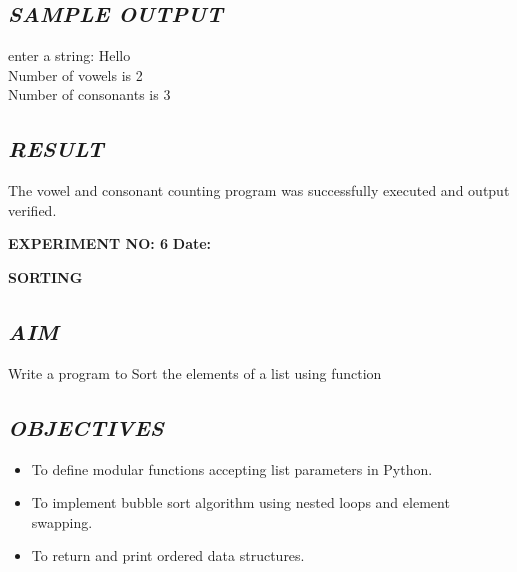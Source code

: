 \documentclass[11pt,a4paper]{article}
\begin{document}
\subsection*{\textit{SAMPLE OUTPUT}}
\begin{tcolorbox}[colback=black!85,colframe=navyblue,title=\textbf{Terminal Output},coltitle=white,fonttitle=\bfseries\small]
\small\ttfamily\color{green!30!white}
enter a string: Hello\\
Number of vowels is  2\\
Number of consonants is  3
\end{tcolorbox}

\subsection*{\textit{RESULT}}
The vowel and consonant counting program was successfully executed and output verified.

\newpage

\noindent
\textbf{\large EXPERIMENT NO: 6} \hfill \textbf{\large Date: \underline{\hspace{3cm}}}

\vspace{0.2cm}
\begin{center}
{\Huge \textbf{\textcolor{navyblue}{SORTING}}}
\end{center}
\vspace{0.3cm}

\subsection*{\textit{AIM}}
Write a program to Sort the elements of a list using function

\subsection*{\textit{OBJECTIVES}}
\begin{itemize}
  \item To define modular functions accepting list parameters in Python.
  \item To implement bubble sort algorithm using nested loops and element swapping.
  \item To return and print ordered data structures.
\end{itemize}
\end{document}
